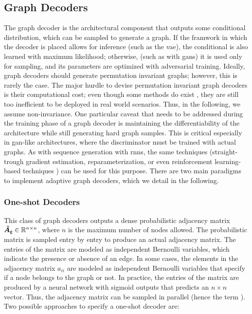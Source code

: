 \subsection{Graph Decoders}
The graph decoder is the architectural component that outputs some conditional distribution, which can be sampled to generate a graph. If the framwork in which the decoder is placed allows for inference (such as the \gls{vae}), the conditional is also learned with maximum likelihood; otherwise, (such as with \glspl{gan}) it is used only for sampling, and its parameters are optimized with adversarial training. Ideally, graph decoders should generate permutation invariant graphs; however, this is rarely the case. The major hurdle to devise permutation invariant graph decoders is their computational cost; even though some methods do exist \citep{ermon2020permutationinvariantgraphgeneration}, they are still too inefficient to be deployed in real world scenarios. Thus, in the following, we assume non-invariance.
One particular caveat that needs to be addressed during the training phase of a graph decoder is maintaining the differentiability of the architecture while still generating hard graph samples. This is critical especially in \gls{gan}-like architectures, where the discriminator must be trained with actual graphs. As with sequence generation with \glspl{rnn}, the same techniques (straight-trough gradient estimation, reparameterization, or even reinforcement learning-based techniques \cite{williams1992reinforce}) can be used for this purpose. There are two main paradigms to implement adaptive graph decoders, which we detail in the following.

\subsubsection*{One-shot Decoders}
This class of graph decoders outputs a dense probabilistic adjacency matrix $\ProbAdjMatrix{g} \in \Real^{n \times n}$, where $n$ is the maximum number of nodes allowed. The probabilistic matrix is sampled entry by entry to produce an actual adjacency matrix. The entries of the matrix are modeled as independent Bernoulli variables, which indicate the presence or absence of an edge. In some cases, the elements in the adjacency matrix $a_{ii}$ are modeled as independent Bernoulli variables that specify if a node belongs to the graph or not. In practice, the entries of the matrix are produced by a neural network with sigmoid outputs that predicts an $n \times n$ vector. Thus, the adjacency matrix can be sampled in parallel (hence the term ). Two possible approaches to specify a one-shot decoder are:

